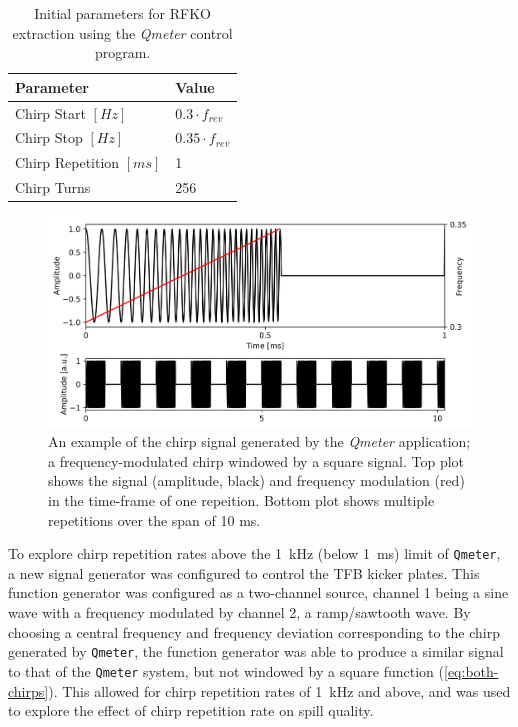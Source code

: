 \documentclass[11pt]{report}
\begin{document}
\begin{table}[]
  \centering
  \begin{tabular}{ll}
    \centering
  Parameter                 & Value                  \\ \hline \hline
  Chirp Start $[Hz]$        & $0.3\cdot f_{rev}$     \\
  Chirp Stop $[Hz]$         & $0.35\cdot f_{rev}$    \\
  Chirp Repetition $[ms]$   & 1                      \\
  Chirp Turns               & 256                   
  \end{tabular}
  \caption{Initial parameters for RFKO extraction using the \textit{Qmeter} control program.}\label{tab:qmeter-params}
\end{table}

\begin{figure}
  \centering
  \includegraphics[width=0.6\linewidth]{fake-signal.png}
  \caption{An example of the chirp signal generated by the \textit{Qmeter} application; a frequency-modulated chirp windowed by a square signal. Top plot shows the signal (amplitude, black) and frequency modulation (red) in the time-frame of one repeition. Bottom plot shows multiple repetitions over the span of 10 ms.}\label{fig:qmeter-signal}
\end{figure}

To explore chirp repetition rates above the \qty{1}{\kilo\hertz} (below \qty{1}{\milli\second}) limit of \verb|Qmeter|, a new signal generator was configured to control the TFB kicker plates. This function generator was configured as a two-channel source, channel 1 being a sine wave with a frequency modulated by channel 2, a ramp/sawtooth wave. By choosing a central frequency and frequency deviation corresponding to the chirp generated by \verb|Qmeter|, the function generator was able to produce a similar signal to that of the \verb|Qmeter| system, but not windowed by a square function (\autoref{eq:both-chirps}). This allowed for chirp repetition rates of \qty{1}{\kilo\hertz} and above, and was used to explore the effect of chirp repetition rate on spill quality.
\end{document}
